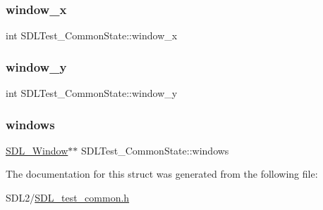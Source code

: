 \subsubsection{\texorpdfstring{window\+\_\+x}{window\_x}}
{\footnotesize\ttfamily int S\+D\+L\+Test\+\_\+\+Common\+State\+::window\+\_\+x}

\mbox{\label{struct_s_d_l_test___common_state_a1fcd61cbe37c2bb563e7b2f1c6853d29}} 
\subsubsection{\texorpdfstring{window\+\_\+y}{window\_y}}
{\footnotesize\ttfamily int S\+D\+L\+Test\+\_\+\+Common\+State\+::window\+\_\+y}

\mbox{\label{struct_s_d_l_test___common_state_a0a054f0c45eb9d21f9561d701e721106}} 
\subsubsection{\texorpdfstring{windows}{windows}}
{\footnotesize\ttfamily \hyperlink{_s_d_l__video_8h_a55a196c7d3b8497538632c79ae1e6392}{S\+D\+L\+\_\+\+Window}$\ast$$\ast$ S\+D\+L\+Test\+\_\+\+Common\+State\+::windows}



The documentation for this struct was generated from the following file\+:\begin{DoxyCompactItemize}
\item 
S\+D\+L2/\hyperlink{_s_d_l__test__common_8h}{S\+D\+L\+\_\+test\+\_\+common.\+h}\end{DoxyCompactItemize}
